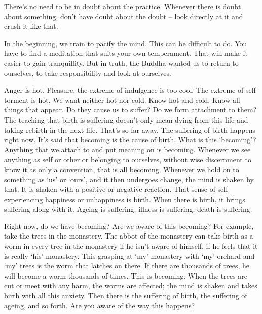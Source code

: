 There's no need to be in doubt about the practice. Whenever there is doubt about something, don't have doubt about the doubt -- look directly at it and crush it like that.

In the beginning, we train to pacify the mind. This can be difficult to do. You have to find a meditation that suits your own temperament. That will make it easier to gain tranquillity. But in truth, the Buddha wanted us to return to ourselves, to take responsibility and look at ourselves.

Anger is hot. Pleasure, the extreme of indulgence is too cool. The extreme of self-torment is hot. We want neither hot nor cold. Know hot and cold. Know all things that appear. Do they cause us to suffer? Do we form attachment to them? The teaching that birth is suffering doesn't only mean dying from this life and taking rebirth in the next life. That's so far away. The suffering of birth happens right now. It's said that becoming is the cause of birth. What is this `becoming'? Anything that we attach to and put meaning on is becoming. Whenever we see anything as self or other or belonging to ourselves, without wise discernment to know it as only a convention, that is all becoming. Whenever we hold on to something as `us' or `ours', and it then undergoes change, the mind is shaken by that. It is shaken with a positive or negative reaction. That sense of self experiencing happiness or unhappiness is birth. When there is birth, it brings suffering along with it. Ageing is suffering, illness is suffering, death is suffering.

Right now, do we have becoming? Are we aware of this becoming? For example, take the trees in the monastery. The abbot of the monastery can take birth as a worm in every tree in the monastery if he isn't aware of himself, if he feels that it is really `his' monastery. This grasping at `my' monastery with `my' orchard and `my' trees is the worm that latches on there. If there are thousands of trees, he will become a worm thousands of times. This is becoming. When the trees are cut or meet with any harm, the worms are affected; the mind is shaken and takes birth with all this anxiety. Then there is the suffering of birth, the suffering of ageing, and so forth. Are you aware of the way this happens?

